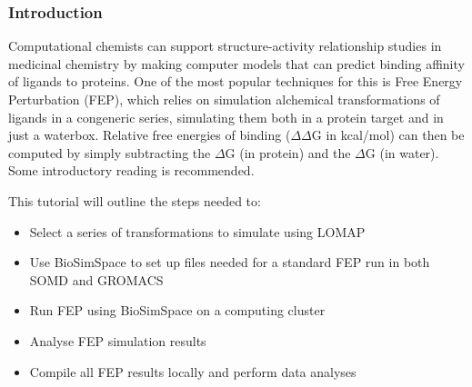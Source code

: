 
\subsubsection{Introduction}


Computational chemists can support structure-activity relationship
studies in medicinal chemistry by making computer models that can
predict binding affinity of ligands to proteins. One of the most popular
techniques for this is Free Energy Perturbation (FEP), which relies on
simulation alchemical transformations of ligands in a congeneric series,
simulating them both in a protein target and in just a waterbox.
Relative free energies of binding ($\Delta\Delta$G in kcal/mol) can then be computed
by simply subtracting the $\Delta$G (in protein) and the $\Delta$G (in water). Some
introductory reading is recommended. \cite{mey2020best, cournia_allen_sherman_2017, kuhn_firth-clark_tosco_mey_mackey_michel_2020}

This tutorial will outline the steps needed to:

\begin{itemize}
\item
  Select a series of transformations to simulate using LOMAP
\item
  Use BioSimSpace to set up files needed for a standard FEP run in both
  SOMD and GROMACS
\item
  Run FEP using BioSimSpace on a computing cluster
\item
  Analyse FEP simulation results
\item
  Compile all FEP results locally and perform data analyses
\end{itemize}


